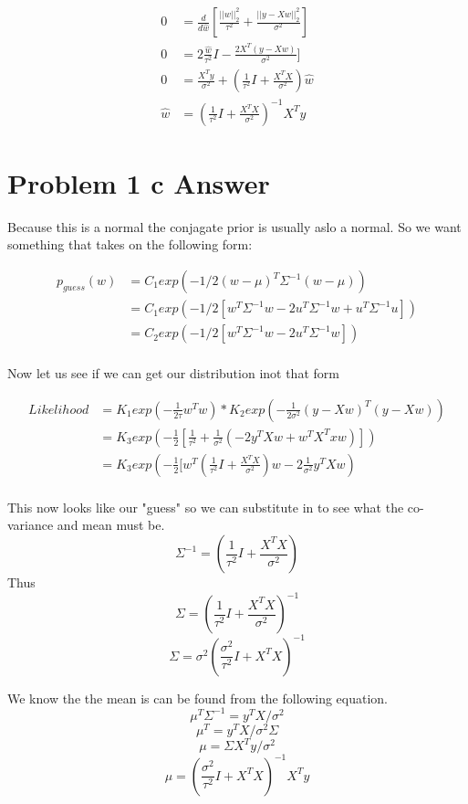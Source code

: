 \documentclass{article}
\newcommand{\1}{\mathbf{1}}
\begin{document}
\begin{align}
    0 & = \frac{d}{d\hat{w}} [  \frac{||w||_2^2}{ \tau^2 } +  \frac{|| y - Xw ||^2_2}{\sigma^2}  ]  \\ 
    0 & = 2 \frac{\hat{w}}{ \tau^2 } I -  \frac{ 2 X^T (y-X w) }{\sigma^2}  ]  \\ 
    0 & = \frac{X^Ty}{\sigma^2} + (\frac{1}{\tau^2} I + \frac{X^TX}{\sigma^2}) \hat{w} \\
    \hat{w} & = (\frac{1}{\tau^2} I + \frac{X^TX}{\sigma^2})^{-1} X^T y
\end{align}


\section*{Problem 1 c Answer}
Because this is a normal the conjagate prior is usually aslo a normal. So we want something that takes on the following form:

\begin{align}
    p_{guess}(w) & = C_1 exp(-1/2 (w-\mu)^T \Sigma^{-1} (w - \mu )) \\
    & = C_1 exp( -1/2 [ w^T \Sigma^{-1} w - 2 u^T\Sigma^{-1} w + u^T\Sigma^{-1} u ]) \\
    & = C_2 exp( -1/2 [ w^T \Sigma^{-1} w - 2 u^T\Sigma^{-1} w ]) \\
\end{align}

Now let us see if we can get our distribution inot that form


\begin{align}
    Likelihood & = K_1 exp( -\frac{1}{2\tau} w^Tw ) * K_2 exp(-\frac{1}{2\sigma^2} (y-Xw)^T(y-Xw) ) \\ 
    & = K_3 exp(-\frac{1}{2} [ \frac{1}{\tau^2} + \frac{1}{\sigma^2} (-2y^TXw + w^TX^Txw) ]) \\
    & = K_3 exp(-\frac{1}{2} [ w^T ( \frac{1}{\tau^2} I   +\frac{ X^TX}{\sigma^2} ) w  - 2 \frac{1}{\sigma^2} y^T X w) \\
\end{align}

This now looks like our "guess" so we can substitute in to see what the co-variance and mean must be. 
$$\Sigma^{-1} = ( \frac{1}{\tau^2} I + \frac{X^TX}{\sigma^2} )$$
Thus 
$$\Sigma = ( \frac{1}{\tau^2} I + \frac{X^TX}{\sigma^2} )^{-1} $$
$$\Sigma = \sigma^2 ( \frac{\sigma^2}{\tau^2} I +X^T X )^{-1} $$

We know the the mean is can be found from the following equation. 
$$ \mu^T \Sigma^{-1} = y^TX/\sigma^2 $$
$$ \mu^T = y^TX/\sigma^2 \Sigma  $$
$$ \mu  =  \Sigma  X^T y /\sigma^2 $$
$$ \mu  =   ( \frac{\sigma^2}{\tau^2} I +X^T X )^{-1}  X^T y  $$
\end{document}
